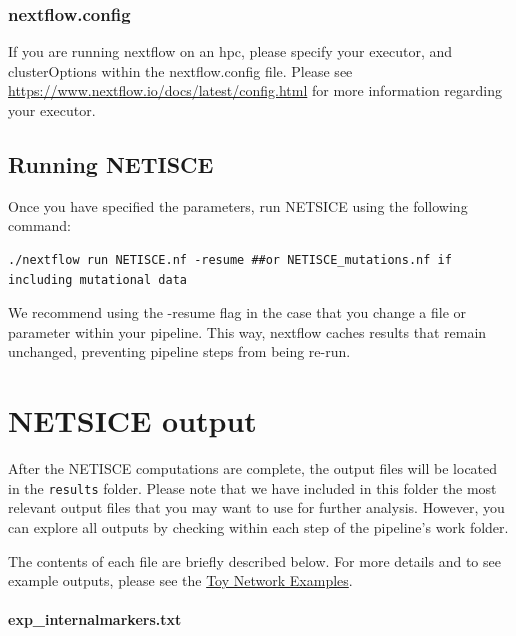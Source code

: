 \documentclass[
]{book}
\theoremstyle{definition}
\theoremstyle{definition}
\theoremstyle{definition}
\theoremstyle{definition}
\theoremstyle{remark}
\begin{document}
\hypertarget{nextflow.config}{%
\subsection{nextflow.config}\label{nextflow.config}}

If you are running nextflow on an hpc, please specify your executor, and clusterOptions within the nextflow.config file. Please see \url{https://www.nextflow.io/docs/latest/config.html} for more information regarding your executor.

\hypertarget{running-netisce}{%
\section{Running NETISCE}\label{running-netisce}}

Once you have specified the parameters, run NETSICE using the following command:

\begin{verbatim}
./nextflow run NETISCE.nf -resume ##or NETISCE_mutations.nf if including mutational data
\end{verbatim}

We recommend using the -resume flag in the case that you change a file or parameter within your pipeline. This way, nextflow caches results that remain unchanged, preventing pipeline steps from being re-run.

\hypertarget{netsice-output}{%
\chapter{NETSICE output}\label{netsice-output}}

After the NETISCE computations are complete, the output files will be located in the \texttt{results} folder. Please note that we have included in this folder the most relevant output files that you may want to use for further analysis. However, you can explore all outputs by checking within each step of the pipeline's work folder.

The contents of each file are briefly described below. For more details and to see example outputs, please see the \protect\hyperlink{toy}{Toy Network Examples}.

\hypertarget{section-id}{%
\subsubsection*{exp\_internalmarkers.txt}\label{section-id}}
\end{document}
